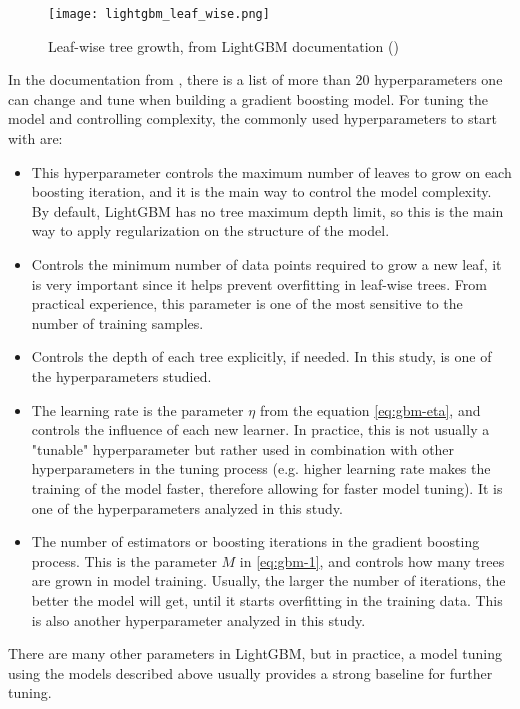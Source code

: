 \begin{figure}[!h]
    \centering
    \texttt{[image: lightgbm\_leaf\_wise.png]} 
    \caption{Leaf-wise tree growth, from LightGBM documentation (\cite{lightgbmparams})}
    \label{fig:lightgbm-grow} 
  \end{figure}

In the documentation from \cite{lightgbmparams}, there is a list of more than 20 hyperparameters one can change and tune when building a gradient boosting model. For tuning the model and controlling complexity, the commonly used hyperparameters to start with are:

\begin{itemize}

    \item \textbf{}
    
    This hyperparameter controls the maximum number of leaves to grow on each boosting iteration, and it is the main way to control the model complexity. By default, LightGBM has no tree maximum depth limit, so this is the main way to apply regularization on the structure of the model. 

    \item \textbf{}
    
    Controls the minimum number of data points required to grow a new leaf, it is very important since it helps prevent overfitting in leaf-wise trees. From practical experience, this parameter is one of the most sensitive to the number of training samples.

    \item \textbf{}
    
    Controls the depth of each tree explicitly, if needed. In this study,  is one of the hyperparameters studied.

    \item \textbf{}
    
    The learning rate is the parameter $\eta$ from the equation \ref{eq:gbm-eta}, and controls the influence of each new learner. In practice, this is not usually a "tunable" hyperparameter but rather used in combination with other hyperparameters in the tuning process (e.g. higher learning rate makes the training of the model faster, therefore allowing for faster model tuning). It is one of the hyperparameters analyzed in this study. 

   \item \textbf{}
   
   The number of estimators or boosting iterations in the gradient boosting process. This is the parameter $M$ in \ref{eq:gbm-1}, and controls how many trees are grown in model training. Usually, the larger the number of iterations, the better the model will get, until it starts overfitting in the training data. This is also another hyperparameter analyzed in this study.

\end{itemize}

There are many other parameters in LightGBM, but in practice, a model tuning using the models described above usually provides a strong baseline for further tuning.
